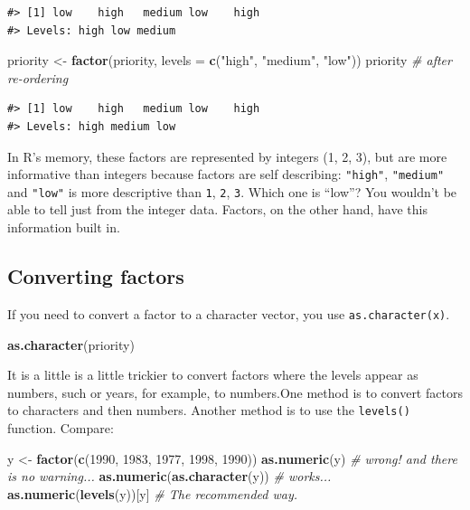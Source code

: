 \documentclass[
]{book}
\newenvironment{Shaded}{\begin{snugshade}}{\end{snugshade}}
\newcommand{\AttributeTok}[1]{\textcolor[rgb]{0.13,0.29,0.53}{#1}}
\newcommand{\CommentTok}[1]{\textcolor[rgb]{0.56,0.35,0.01}{\textit{#1}}}
\newcommand{\DecValTok}[1]{\textcolor[rgb]{0.00,0.00,0.81}{#1}}
\newcommand{\FunctionTok}[1]{\textcolor[rgb]{0.13,0.29,0.53}{\textbf{#1}}}
\newcommand{\NormalTok}[1]{#1}
\newcommand{\OtherTok}[1]{\textcolor[rgb]{0.56,0.35,0.01}{#1}}
\newcommand{\StringTok}[1]{\textcolor[rgb]{0.31,0.60,0.02}{#1}}
\begin{document}
\begin{verbatim}
#> [1] low    high   medium low    high  
#> Levels: high low medium
\end{verbatim}

\begin{Shaded}
\begin{Highlighting}[]
\NormalTok{priority }\OtherTok{\textless{}{-}} \FunctionTok{factor}\NormalTok{(priority, }\AttributeTok{levels =} \FunctionTok{c}\NormalTok{(}\StringTok{"high"}\NormalTok{, }\StringTok{"medium"}\NormalTok{, }\StringTok{"low"}\NormalTok{))}
\NormalTok{priority }\CommentTok{\# after re{-}ordering}
\end{Highlighting}
\end{Shaded}

\begin{verbatim}
#> [1] low    high   medium low    high  
#> Levels: high medium low
\end{verbatim}

In R's memory, these factors are represented by integers (1, 2, 3), but are more
informative than integers because factors are self describing: \texttt{"high"},
\texttt{"medium"} and \texttt{"low"} is more descriptive than \texttt{1}, \texttt{2}, \texttt{3}. Which one is ``low''? You wouldn't
be able to tell just from the integer data. Factors, on the other hand, have
this information built in.

\hypertarget{converting-factors}{%
\subsection{Converting factors}\label{converting-factors}}

If you need to convert a factor to a character vector, you use
\texttt{as.character(x)}.

\begin{Shaded}
\begin{Highlighting}[]
\FunctionTok{as.character}\NormalTok{(priority)}
\end{Highlighting}
\end{Shaded}

It is a little is a little trickier to convert factors where the levels appear as numbers, such or years, for example, to numbers.One method is to
convert factors to characters and then numbers. Another method is to use the \texttt{levels()} function. Compare:

\begin{Shaded}
\begin{Highlighting}[]
\NormalTok{y }\OtherTok{\textless{}{-}} \FunctionTok{factor}\NormalTok{(}\FunctionTok{c}\NormalTok{(}\DecValTok{1990}\NormalTok{, }\DecValTok{1983}\NormalTok{, }\DecValTok{1977}\NormalTok{, }\DecValTok{1998}\NormalTok{, }\DecValTok{1990}\NormalTok{))}
\FunctionTok{as.numeric}\NormalTok{(y)               }\CommentTok{\# wrong! and there is no warning...}
\FunctionTok{as.numeric}\NormalTok{(}\FunctionTok{as.character}\NormalTok{(y)) }\CommentTok{\# works...}
\FunctionTok{as.numeric}\NormalTok{(}\FunctionTok{levels}\NormalTok{(y))[y]    }\CommentTok{\# The recommended way.}
\end{Highlighting}
\end{Shaded}
\end{document}
